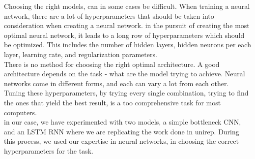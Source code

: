 Choosing the right models, can in some cases be difficult. When training a neural network, there are a lot of hyperparameters that should be taken into consideration when creating a neural network. in the pursuit of creating the most optimal neural network, it leads to a long row of hyperparameters which should be optimized. This includes the number of hidden layers, hidden neurons per each layer, learning rate, and regularization parameters. \\

\noindent
There is no method for choosing the right optimal architecture. A good architecture depends on the task - what are the model trying to achieve. Neural networks come in different forms, and each can vary a lot from each other. Tuning these hyperparameters, by trying every single combination, trying to find the ones that yield the best result, is a too comprehensive task for most computers. \\

\noindent
in our case, we have experimented with two models, a simple bottleneck CNN, and an LSTM RNN where we are replicating the work done in unirep\cite{unirep}. During this process, we used our expertise in neural networks, in choosing the correct hyperparameters for the task.
